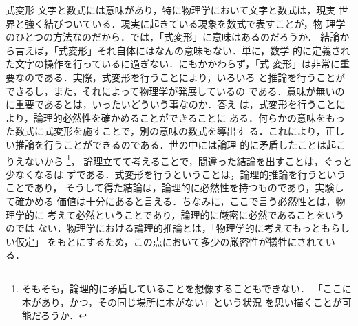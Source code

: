         \begin{mysmallsec}{式変形}
                        文字と数式には意味があり，特に物理学において文字と数式は，現実
            世界と強く結びついている．現実に起きている現象を数式で表すことが，物
            理学のひとつの方法なのだから．では，「式変形」に意味はあるのだろうか．
            結論から言えば，「式変形」それ自体にはなんの意味もない．単に，数学
            的に定義された文字の操作を行っているに過ぎない．にもかかわらず，「式
            変形」は非常に重要なのである．実際，式変形を行うことにより，いろいろ
            と推論を行うことができるし，また，それによって物理学が発展しているの
            である．意味が無いのに重要であるとは，いったいどういう事なのか．答え
            は，式変形を行うことにより，論理的必然性を確かめることができることに
            ある．何らかの意味をもった数式に式変形を施すことで，別の意味の数式を導出す
            る．これにより，正しい推論を行うことができるのである．世の中には論理
            的に矛盾したことは起こりえないから
                \footnote{
                    そもそも，論理的に矛盾していることを想像することもできない．
                    「ここに本があり，かつ，その同じ場所に本がない」という状況
                    を思い描くことが可能だろうか．
                }，
            論理立てて考えることで，間違った結論を出すことは，ぐっと少なくなるは
            ずである．式変形を行うということは，論理的推論を行うということであり，
            そうして得た結論は，論理的に必然性を持つものであり，実験して確かめる
            価値は十分にあると言える．ちなみに，ここで言う必然性とは，物理学的に
            考えて必然ということであり，論理的に厳密に必然であることをいうのでは
            ない．物理学における論理的推論とは，「物理学的に考えてもっともらしい仮定」
            をもとにするため，この点において多少の厳密性が犠牲にされている．
        \end{mysmallsec}


